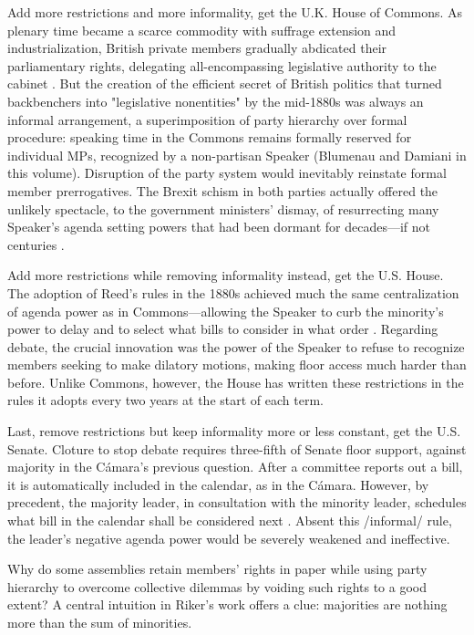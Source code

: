 Add more restrictions and more informality, get the U.K. House of Commons. As plenary time became a scarce commodity with suffrage extension and industrialization, British private members gradually abdicated their parliamentary rights, delegating all-encompassing legislative authority to the cabinet \citep{cox.1987}. But the creation of the efficient secret of British politics that turned backbenchers into "legislative nonentities" by the mid-1880s was always an informal arrangement, a superimposition of party hierarchy over formal procedure: speaking time in the Commons remains formally reserved for individual MPs, recognized by a non-partisan Speaker (Blumenau and Damiani in this volume). Disruption of the party system would inevitably reinstate formal member prerrogatives. The Brexit schism in both parties actually offered the unlikely spectacle, to the government ministers' dismay, of resurrecting many Speaker's agenda setting powers that had been dormant for decades---if not centuries \citep{economist-bercow.2019}.

Add more restrictions while removing informality instead, get the U.S. House. The adoption of Reed's rules in the 1880s achieved much the same centralization of agenda power as in Commons---allowing the Speaker to curb the minority's power to delay and to select what bills to consider in what order \citep{cox.mccubbins.2005}. Regarding debate, the crucial innovation was the power of the Speaker to refuse to recognize members seeking to make dilatory motions, making floor access much harder than before. Unlike Commons, however, the House has written these restrictions in the rules it adopts every two years at the start of each term.  

Last, remove restrictions but keep informality more or less constant, get the U.S. Senate. Cloture to stop debate requires three-fifth of Senate floor support, against majority in the Cámara's previous question. After a committee reports out a bill, it is automatically included in the calendar, as in the Cámara. However, by precedent, the majority leader, in consultation with the minority leader, schedules what bill in the calendar shall be considered next \citep{roberts-smith.2007,campbell.cox.mccubbins.2002}. Absent this /informal/ rule, the leader's negative agenda power would be severely weakened and ineffective.

Why do some assemblies retain members' rights in paper while using party hierarchy to overcome collective dilemmas by voiding such rights to a good extent? A central intuition in Riker's work offers a clue: majorities are nothing more than the sum of minorities.

